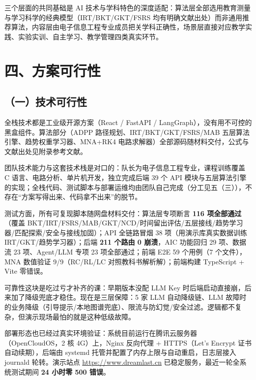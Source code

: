 \documentclass[zihao=-4,a4paper,UTF8,fontset=windows]{ctexart}
\begin{document}
三个层面的共同基础是 AI 技术与学科特色的深度适配：算法层全部选用教育测量与学习科学的经典模型（IRT/BKT/GKT/FSRS 均有明确文献出处）而非通用推荐算法，内容层由电子信息工程专业成员把关学科正确性，场景层直接对应教学实践、实验实训、自主学习、教学管理四类真实环节。

\section{四、方案可行性}
\subsection{（一）技术可行性}


全栈技术都是工业级开源方案（React / FastAPI / LangGraph），没有用不可控的黑盒组件。算法部分（ADPP 路径规划、IRT/BKT/GKT/FSRS/MAB 五层算法引擎、趋势权重学习器、MNA+RK4 电路求解器）全部源码随材料交付，公式与文献出处见附录参考文献。



团队技术能力与这套技术栈是对口的：队长为电子信息工程专业，课程训练覆盖 C 语言、电路分析、单片机开发，独立完成后端 39 个 API 模块与五层算法引擎的实现；全栈代码、测试脚本与部署运维均由团队自己完成（分工见五（三）），不存在“方案写得出来、代码拿不出来”的脱节。



测试方面，所有可复现脚本随网盘材料交付：算法层专项断言 \textbf{116 项全部通过}（覆盖 BKT/IRT/FSRS/MAB/GKT/NCD/时间留出评估/五层接线/趋势学习器/匹配探索/安全与接线加固）；API 全链路冒烟 38 项（用演示库真实数据训练 IRT/GKT/趋势学习器）；后端 \textbf{211 个路由 0 崩溃}，AIC 功能回归 29 项、数据流 23 项、Agent/LLM 专项 23 项全部通过；前端 E2E 59 个用例（7 个文件），MNA 数值验证 9/9（RC/RL/LC 对照教科书解析解）；前端构建 TypeScript + Vite 零错误。



可靠性这块是吃过亏才补齐的课：早期版本没配 LLM Key 时后端启动直接崩，后来加了降级兜底才稳住。现在是三层保障：5 家 LLM 自动降级链、LLM 故障时的业务降级（引导提示/本地图谱兜底）、限流与防幻觉/安全过滤。逻辑都不复杂，但演示现场最怕的就是这种低级故障。



部署形态也已经过真实环境验证：系统目前运行在腾讯云服务器（OpenCloudOS，2 核 4G）上，Nginx 反向代理 + HTTPS（Let's Encrypt 证书自动续期），后端由 systemd 托管并配置了内存上限与自动重启，日志层接入 journald 轮转。演示站点 \url{https://www.dreamlast.cn} 已稳定服务，最近一轮全系统测试期间 \textbf{24 小时零 500 错误}。
\end{document}
